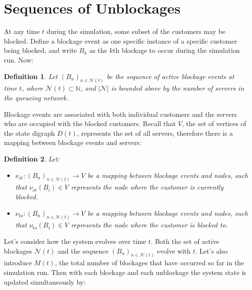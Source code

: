 \documentclass{article}
\newtheorem{definition}{Definition}
\begin{document}
\section{Sequences of Unblockages}\label{sec:unblockages}
At any time $t$ during the simulation, some subset of the customers may be
blocked.
Define a blockage event as one specific instance of a specific customer being
blocked, and write $B_k$ as the $k$th blockage to occur during the simulation
run.
Now:

\begin{definition}
Let $(B_n)_{n \in \mathcal{N}(t)}$ be the sequence of active blockage events at
time $t$, where $\mathcal{N}(t) \subset \mathbb{N}$, and $|\mathcal{N}|$ is
bounded above by the number of servers in the queueing network.
\end{definition}

Blockage events are associated with both individual customers and the servers
who are occupied with the blocked customers.
Recall that $V$, the set of vertices of the state digraph $D(t)$, represents the
set of all servers, therefore there is a mapping between blockage events and
servers:

\begin{definition}
Let:
\begin{itemize}
  \item $\nu_{\text{at}}: (B_n)_{n \in \mathcal{N}(t)} \rightarrow V$ be a
  mapping between blockage events and nodes, such that
  $\nu_{\text{at}}(B_i) \in V$ represents the node where the customer is
  currently blocked.
  \item $\nu_{\text{to}}: (B_n)_{n \in \mathcal{N}(t)} \rightarrow V$ be a
  mapping between blockage events and nodes, such that
  $\nu_{\text{to}}(B_i) \in V$ represents the node where the customer is blocked
  to.
\end{itemize}
\end{definition}

Let's consider how the system evolves over time $t$.
Both the set of active blockages $\mathcal{N}(t)$ and the sequence
$(B_n)_{n \in \mathcal{N}(t)}$ evolve with $t$.
Let's also introduce $M(t)$, the total number of blockages that have occurred so
far in the simulation run.
Then with each blockage and each unblockage the system state is updated
simultaneously by:
\end{document}
